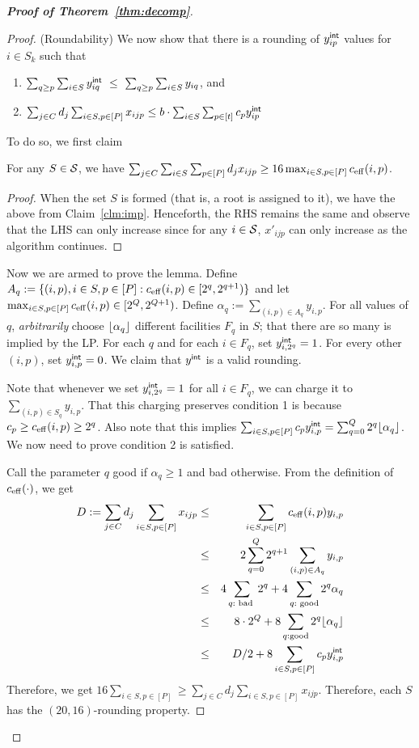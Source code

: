 \begin{proof}[{\bf Proof of Theorem~\ref{thm:decomp}}]
\begin{proof}
\noindent
(Roundability)
We now show that there is a rounding of $y^{{\mathsf{int}}}_{ip}$ values for $i\in S_k$ such that
		\begin{enumerate}
			\item $\sum_{q \geq p} \sum_{i\in S} y^{{\mathsf{int}}}_{iq} ~\leq~ \sum_{q \geq p}\sum_{i\in S} y_{iq}$, and
			\item $\sum_{j\in C} d_j \sum_{i\in S,p\in [P]} x_{ijp} \leq b\cdot \sum_{i\in S} \sum_{p\in [t]} c_py^{{\mathsf{int}}}_{ip}$
		\end{enumerate}
To do so, we first claim
\begin{claim}\label{clm:imp2}
	For any $S\in {\cal S}$, we have $\sum_{j\in C}\sum_{i\in S}\sum_{p\in [P]} d_jx_{ijp} \geq 16\max_{i\in S,p\in [P]} c_{\mathrm{eff}}(i,p)$.
\end{claim}
\begin{proof}
	When the set $S$ is formed (that is, a root is assigned to it), we have the above from Claim~\ref{clm:imp}. Henceforth, the RHS remains the same and observe that the LHS can only increase since for any $i\in {\cal S}$, $x'_{ijp}$ can only increase as the algorithm continues.
\end{proof}
\noindent
Now we are armed to prove the lemma. Define $A_q := \{(i,p), i\in S,p\in [P]: c_{\mathrm{eff}}(i,p) \in [2^q,2^{q+1})\}$ and let $\max_{i\in S,p\in [P]} c_{\mathrm{eff}}(i,p) \in [2^Q,2^{Q+1})$.
Define $\alpha_q := \sum_{(i,p) \in A_q} y_{i,p}$.
For all values of $q$, {\em arbitrarily} choose $\lfloor\alpha_q\rfloor$ different facilities $F_q$ in $S$; that there are so many is implied by the LP.
For each $q$ and for each $i\in F_q$, set $y^{{\mathsf{int}}}_{i,2^q} = 1$. For every other $(i,p)$, set $y^{{\mathsf{int}}}_{i,p} = 0$. We claim that $y^{{\mathsf{int}}}$ is a valid rounding. \smallskip

Note that whenever we set $y^{{\mathsf{int}}}_{i,2^q} = 1$ for all $i\in F_q$, we can charge it to $\sum_{(i,p)\in S_q} y_{i,p}$. That this charging preserves condition 1 is because $c_p \geq c_{\mathrm{eff}}(i,p) \geq 2^q$.
Also note that this implies $\sum_{i\in S,p\in [P]} c_p y^{{\mathsf{int}}}_{i,p} = \sum_{q=0}^Q 2^q\lfloor\alpha_q\rfloor$.
We now need to prove condition 2 is satisfied. \smallskip

Call the parameter $q$ good if $\alpha_q \geq 1$ and bad otherwise.
From the definition of $c_{\mathrm{eff}}(\cdot)$, we get
\begin{eqnarray}
D := \sum_{j\in C} d_j \sum_{i\in S,p\in [P]} x_{ijp} & \leq &  \sum_{i\in S,p\in [P]} c_{\mathrm{eff}}(i,p)y_{i,p} \\
																				& \leq & 2 \sum_{q=0}^Q 2^{q+1} \sum_{(i,p)\in A_q} y_{i,p} \\
																				& \leq & 4\sum_{q: \textrm{ bad }} 2^q + 4\sum_{q: \textrm{ good}} 2^q\alpha_q \\
																				& \leq & 8\cdot 2^Q + 8\sum_{q: \textrm{good}}2^q \lfloor\alpha_q\rfloor  \\
																				& \leq & D/2 + 8\sum_{i\in S,p\in [P]}c_py^{{\mathsf{int}}}_{i,p}
\end{eqnarray}
Therefore, we get $16\sum_{i\in S,p\in [P]} \geq \sum_{j\in C} d_j \sum_{i\in S,p\in [P]} x_{ijp}$. Therefore, each $S$ has the $(20,16)$-rounding property.
\end{proof}
\end{proof}

